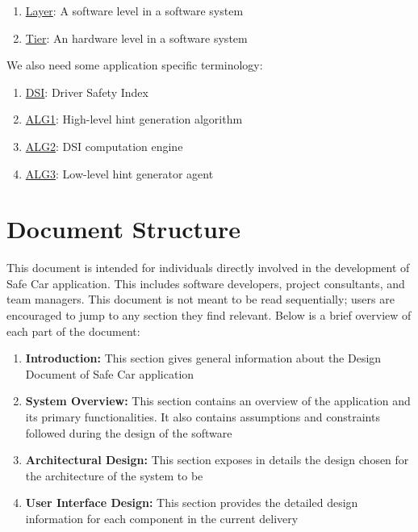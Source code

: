 \begin{enumerate}
	\item \underline{Layer}: A software level in a software system
	\item \underline{Tier}: An hardware level in a software system
\end{enumerate}
We also need some application specific terminology:

\begin{enumerate}
	\item \underline{DSI}: Driver Safety Index
	\item \underline{ALG1}: High-level hint generation algorithm
	\item \underline{ALG2}: DSI computation engine
	\item \underline{ALG3}: Low-level hint generator agent
\end{enumerate}

\section{Document Structure}
This document is intended for individuals directly involved in the development of Safe Car application. This includes software developers, project consultants, and team managers. This document is not meant to be read sequentially; users are encouraged to jump to any section they find relevant. Below is a brief overview of each part of the document:

\begin{enumerate}
	\item \textbf{Introduction:} This section gives general information about the Design Document of Safe Car application
	\item \textbf{System Overview:} This section contains an overview of the application and its primary functionalities. It also contains assumptions and constraints followed during the design of the software
	\item \textbf{Architectural Design:} This section exposes in details the design chosen for the architecture of the system to be
	\item \textbf{User Interface Design:} This section provides the detailed design information for each component in the current delivery
\end{enumerate}